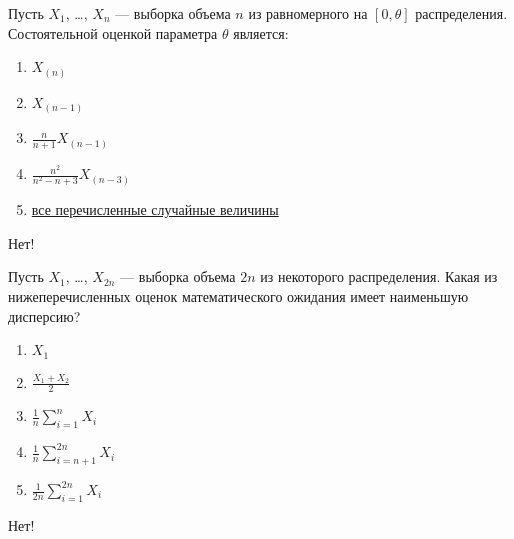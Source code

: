 \documentclass[t]{beamer}
\begin{document}
 \begin{frame} \label{35-No} 
\begin{block}{35} 

Пусть $X_1$, \ldots, $X_n$ — выборка объема $n$ из равномерного на $[0, \theta]$ распределения. Состоятельной оценкой параметра $\theta$ является:
 


 \end{block} 
\begin{enumerate} 
\item[] \hyperlink{35-No}{\beamergotobutton{} $X_(n)$}
\item[] \hyperlink{35-No}{\beamergotobutton{} $X_(n-1)$}
\item[] \hyperlink{35-No}{\beamergotobutton{} $\frac{n}{n+1} X_{(n-1)}$}
\item[] \hyperlink{35-No}{\beamergotobutton{} $\frac{n^2}{n^2-n+3} X_{(n-3)}$}
\item[] \hyperlink{35-Yes}{\beamergotobutton{} все перечисленные случайные величины}
\end{enumerate} 

 \alert{Нет!} 
\end{frame} 


 \begin{frame} \label{36-No} 
\begin{block}{36} 

Пусть $X_1$, \ldots, $X_{2 n}$ — выборка объема $2 n$ из некоторого распределения. Какая из нижеперечисленных оценок математического ожидания имеет наименьшую дисперсию?
 


 \end{block} 
\begin{enumerate} 
\item[] \hyperlink{36-No}{\beamergotobutton{} $X_1$}
\item[] \hyperlink{36-No}{\beamergotobutton{} $\frac{X_1+X_2}{2}$}
\item[] \hyperlink{36-No}{\beamergotobutton{} $\frac{1}{n} \sum_{i=1}^n X_i$}
\item[] \hyperlink{36-No}{\beamergotobutton{} $\frac{1}{n} \sum_{i=n+1}^{2 n} X_i$}
\item[] \hyperlink{36-Yes}{\beamergotobutton{} $\frac{1}{2 n} \sum_{i=1}^{2 n} X_i$}
\end{enumerate} 

 \alert{Нет!} 
\end{frame} 
\end{document}
